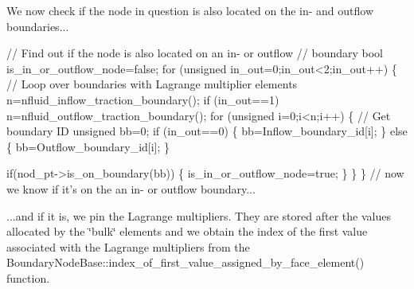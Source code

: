We now check if the node in question is also located on the in-\/ and outflow boundaries...


\begin{DoxyCodeInclude}
       
       \textcolor{comment}{// Find out if the node is also located on an in- or outflow}
       \textcolor{comment}{// boundary}
       \textcolor{keywordtype}{bool} is\_in\_or\_outflow\_node=\textcolor{keyword}{false};
       \textcolor{keywordflow}{for} (\textcolor{keywordtype}{unsigned} in\_out=0;in\_out<2;in\_out++)
        \{
         \textcolor{comment}{// Loop over boundaries with Lagrange multiplier elements}
         n=nfluid\_inflow\_traction\_boundary();
         \textcolor{keywordflow}{if} (in\_out==1) n=nfluid\_outflow\_traction\_boundary();
         \textcolor{keywordflow}{for} (\textcolor{keywordtype}{unsigned} i=0;i<n;i++)
          \{
           \textcolor{comment}{// Get boundary ID}
           \textcolor{keywordtype}{unsigned} bb=0;
           \textcolor{keywordflow}{if} (in\_out==0)
            \{
             bb=Inflow\_boundary\_id[i];
            \}
           \textcolor{keywordflow}{else}
            \{
             bb=Outflow\_boundary\_id[i];
            \}
           
           \textcolor{keywordflow}{if}(nod\_pt->is\_on\_boundary(bb))
            \{
             is\_in\_or\_outflow\_node=\textcolor{keyword}{true};
            \}
          \}
        \} \textcolor{comment}{// now we know if it's on the an in- or outflow boundary...}

\end{DoxyCodeInclude}


...and if it is, we pin the Lagrange multipliers. They are stored after the values allocated by the \char`\"{}bulk\char`\"{} elements and we obtain the index of the first value associated with the Lagrange multipliers from the {\ttfamily Boundary\+Node\+Base\+::index\+\_\+of\+\_\+first\+\_\+value\+\_\+assigned\+\_\+by\+\_\+face\+\_\+element()} function.


